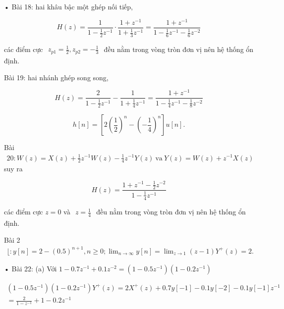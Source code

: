 \documentclass[
  10
]{article}
\begin{document}
• Bài 18: hai khâu bậc một ghép nối tiếp,

\[
H (z) = \frac {1}{1 - \frac {1}{2} z ^ {- 1}} \cdot \frac {1 + z ^ {- 1}}{1 + \frac {1}{3} z ^ {- 1}} = \frac {1 + z ^ {- 1}}{1 - \frac {1}{6} z ^ {- 1} - \frac {1}{6} z ^ {- 2}}
\]

các điểm cực
\(\begin{array} { r } { z _ { p 1 } = \frac { 1 } { 2 } , z _ { p 2 } = - \frac { 1 } { 3 } } \end{array}\)
đều nằm trong vòng tròn đơn vị nên hệ thống ổn định.

Bài 19: hai nhánh ghép song song,

\[
H (z) = \frac {2}{1 - \frac {1}{2} z ^ {- 1}} - \frac {1}{1 + \frac {1}{4} z ^ {- 1}} = \frac {1 + z ^ {- 1}}{1 - \frac {1}{4} z ^ {- 1} - \frac {1}{8} z ^ {- 2}}
\]

\[
h [ n ] = \left[ 2 \left(\frac {1}{2}\right) ^ {n} - \left(- \frac {1}{4}\right) ^ {n} \right] u [ n ].
\]

Bài
\(\begin{array} { r } { 2 0 \colon W ( z ) = X ( z ) + \frac { 1 } { 2 } z ^ { - 1 } W ( z ) - \frac { 1 } { 4 } z ^ { - 1 } Y ( z ) \mathrm { ~ v a ~ } Y ( z ) = W ( z ) + z ^ { - 1 } X ( z ) } \end{array}\)
suy ra

\[
H (z) = \frac {1 + z ^ {- 1} - \frac {1}{2} z ^ {- 2}}{1 - \frac {1}{4} z ^ {- 1}}
\]

các điểm cực \(z = 0\) và
\(\begin{array} { r } { z = \frac { 1 } { 4 } } \end{array}\) đều nằm
trong vòng tròn đơn vị nên hệ thống ổn định.

Bài 2
\(\begin{array} { r } { \lfloor : y [ n ] = 2 - ( 0 . 5 ) ^ { n + 1 } , n \geq 0 ; \operatorname* { l i m } _ { n \to \infty } y [ n ] = \operatorname* { l i m } _ { z \to 1 } ( z - 1 ) Y ^ { + } ( z ) = 2 . } \end{array}\)

• Bài 22: (a) Với
\(1 - 0 . 7 z ^ { - 1 } + 0 . 1 z ^ { - 2 } = ( 1 - 0 . 5 z ^ { - 1 } ) ( 1 - 0 . 2 z ^ { - 1 } )\)

\[
\begin{array}{c} (1 - 0. 5 z ^ {- 1}) (1 - 0. 2 z ^ {- 1}) Y ^ {+} (z) = 2 X ^ {+} (z) + 0. 7 y [ - 1 ] - 0. 1 y [ - 2 ] - 0. 1 y [ - 1 ] z ^ {- 1} \\ = \frac {2}{1 - z ^ {- 1}} + 1 - 0. 2 z ^ {- 1} \end{array}
\]
\end{document}
